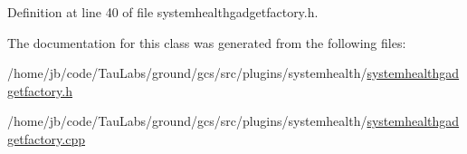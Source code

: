 \-Definition at line 40 of file systemhealthgadgetfactory.\-h.



\-The documentation for this class was generated from the following files\-:\begin{DoxyCompactItemize}
\item 
/home/jb/code/\-Tau\-Labs/ground/gcs/src/plugins/systemhealth/\hyperlink{systemhealthgadgetfactory_8h}{systemhealthgadgetfactory.\-h}\item 
/home/jb/code/\-Tau\-Labs/ground/gcs/src/plugins/systemhealth/\hyperlink{systemhealthgadgetfactory_8cpp}{systemhealthgadgetfactory.\-cpp}\end{DoxyCompactItemize}
